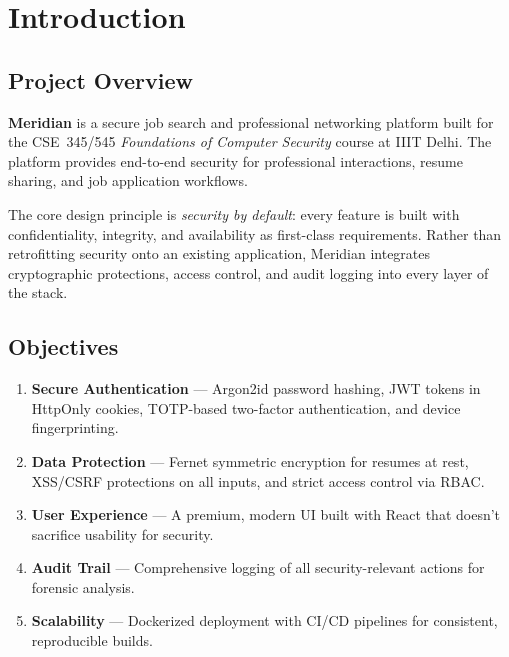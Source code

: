 
\section{Introduction}

\subsection{Project Overview}

\textbf{Meridian} is a secure job search and professional networking platform built for the CSE~345/545 \textit{Foundations of Computer Security} course at IIIT Delhi. The platform provides end-to-end security for professional interactions, resume sharing, and job application workflows.

The core design principle is \textit{security by default}: every feature is built with confidentiality, integrity, and availability as first-class requirements. Rather than retrofitting security onto an existing application, Meridian integrates cryptographic protections, access control, and audit logging into every layer of the stack.

\subsection{Objectives}

\begin{enumerate}[label=\textbf{\arabic*.}]
    \item \textbf{Secure Authentication} — Argon2id password hashing, JWT tokens in HttpOnly cookies, TOTP-based two-factor authentication, and device fingerprinting.
    \item \textbf{Data Protection} — Fernet symmetric encryption for resumes at rest, XSS/CSRF protections on all inputs, and strict access control via RBAC.
    \item \textbf{User Experience} — A premium, modern UI built with React that doesn't sacrifice usability for security.
    \item \textbf{Audit Trail} — Comprehensive logging of all security-relevant actions for forensic analysis.
    \item \textbf{Scalability} — Dockerized deployment with CI/CD pipelines for consistent, reproducible builds.
\end{enumerate}

